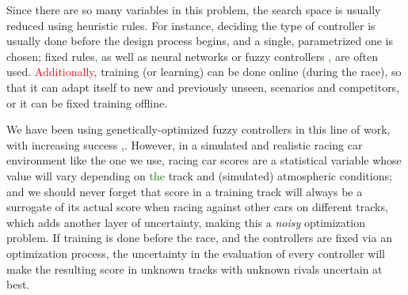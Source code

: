 \documentclass[10pt,journal,compsoc]{IEEEtran}
\begin{document}
Since there are so many variables in this problem, the search space is usually reduced using heuristic rules. For instance, deciding the type of controller is usually done before the design process begins, and a single, parametrized one
is chosen; fixed rules\textcolor{green}{,} as well as neural networks \cite{KIM201287} or fuzzy controllers \cite{PerezEvolvingFuzzy09}\textcolor{green}{,} are often used. \textcolor{red}{
Additionally}, training (or learning) \cite{Loiacono:2012:LEA:2212908.2212953} can be done online (during the
race), so that it can adapt itself to new and previously unseen,
scenarios and competitors, or it can be fixed training offline. 

We have been using genetically-optimized fuzzy controllers in this line of work, with increasing success \cite{salem_evo17},\cite{salem_evo18}.
However, in a simulated and realistic racing car environment like the one we use, racing car scores are a
    statistical variable whose value will vary depending on \textcolor{green}{the} track and
    (simulated) atmospheric conditions; and we should never forget
    that score in a training track will always be a surrogate of its
    actual score when racing against other cars on different tracks,
    which adds another layer of uncertainty, making this a {\em noisy} optimization problem.
If training is done before the
    race, and the controllers are fixed via an optimization process,
    the uncertainty in the evaluation of every controller will make
    the resulting score in unknown tracks with unknown rivals
    uncertain at best.
\end{document}
